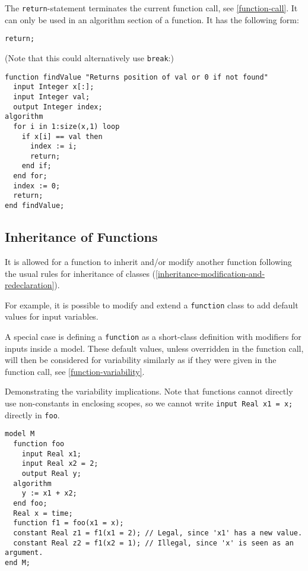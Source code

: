 The \lstinline!return!-statement terminates the current function call, see \cref{function-call}.
It can only be used in an algorithm section of a function.
It has the following form:
\begin{lstlisting}[language=modelica]
return;
\end{lstlisting}

\begin{example}
(Note that this could alternatively use \lstinline!break!:)
\begin{lstlisting}[language=modelica]
function findValue "Returns position of val or 0 if not found"
  input Integer x[:];
  input Integer val;
  output Integer index;
algorithm
  for i in 1:size(x,1) loop
    if x[i] == val then
      index := i;
      return;
    end if;
  end for;
  index := 0;
  return;
end findValue;
\end{lstlisting}
\end{example}

\subsection{Inheritance of Functions}\label{inheritance-of-functions}

It is allowed for a function to inherit and/or modify another function
following the usual rules for inheritance of classes (\cref{inheritance-modification-and-redeclaration}).

\begin{nonnormative}
For example, it is possible to modify and extend a \lstinline!function! class to add default values for input variables.
\end{nonnormative}

A special case is defining a \lstinline!function! as a short-class definition with modifiers for inputs inside a model.
These default values, unless overridden in the function call, will then be considered for variability similarly as if they were given in the function call, see \cref{function-variability}.

\begin{example}
Demonstrating the variability implications.
Note that functions cannot directly use non-constants in enclosing scopes, so we cannot write \lstinline!input Real x1 = x;! directly in \lstinline!foo!.
\begin{lstlisting}[language=modelica]
model M
  function foo
    input Real x1;
    input Real x2 = 2;
    output Real y;
  algorithm
    y := x1 + x2;
  end foo;
  Real x = time;
  function f1 = foo(x1 = x);
  constant Real z1 = f1(x1 = 2); // Legal, since 'x1' has a new value.
  constant Real z2 = f1(x2 = 1); // Illegal, since 'x' is seen as an argument.
end M;
\end{lstlisting}
\end{example}

